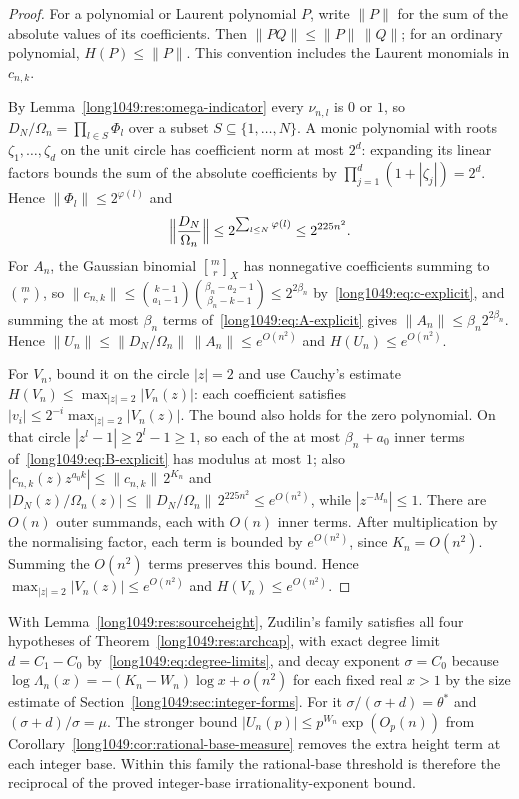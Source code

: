 \documentclass[11pt]{article}
\begin{document}
\begin{proof}
For a polynomial or Laurent polynomial $P$, write $\|P\|$ for the sum
of the absolute values of its coefficients. Then
$\|PQ\|\le\|P\|\,\|Q\|$; for an ordinary polynomial,
$H(P)\le\|P\|$. This convention includes the Laurent monomials in
$c_{n,k}$.

By Lemma~\ref{long1049:res:omega-indicator} every $\nu_{n,l}$ is $0$ or $1$, so
$D_N/\Omega_n=\prod_{l\in S}\Phi_l$ over a subset $S\subseteq\{1,\dots,N\}$.
A monic polynomial with roots $\zeta_1,\ldots,\zeta_d$ on the unit circle
has coefficient norm at most $2^d$: expanding its linear factors bounds
the sum of the absolute coefficients by
$\prod_{j=1}^d(1+|\zeta_j|)=2^d$. Hence $\|\Phi_l\|\le2^{\varphi(l)}$ and
\[
 \Bigl\|\frac{D_N}{\Omega_n}\Bigr\|\le2^{\sum_{l\le N}\varphi(l)}\le2^{225n^{2}} .
\]
For $A_n$, the Gaussian binomial $\genfrac{[}{]}{0pt}{}{m}{r}_X$ has nonnegative
coefficients summing to $\binom{m}{r}$, so
$\|c_{n,k}\|\le\binom{k-1}{a_1-1}\binom{\beta_n-a_2-1}{\beta_n-k-1}\le2^{2\beta_n}$
by~\eqref{long1049:eq:c-explicit}, and summing the at most $\beta_n$ terms
of~\eqref{long1049:eq:A-explicit} gives $\|A_n\|\le\beta_n2^{2\beta_n}$.  Hence
$\|U_n\|\le\|D_N/\Omega_n\|\,\|A_n\|\le e^{O(n^{2})}$ and
$H(U_n)\le e^{O(n^{2})}$.

For $V_n$, bound it on the circle $|z|=2$ and use Cauchy's estimate
$H(V_n)\le\max_{|z|=2}|V_n(z)|$: each coefficient satisfies
$|v_i|\le2^{-i}\max_{|z|=2}|V_n(z)|$. The bound also holds for the
zero polynomial.  On that circle
$|z^{l}-1|\ge2^{l}-1\ge1$, so each of the at most $\beta_n+a_0$ inner terms
of~\eqref{long1049:eq:B-explicit} has modulus at most $1$; also
$|c_{n,k}(z)z^{a_0k}|\le\|c_{n,k}\|\,2^{K_n}$ and
$|D_N(z)/\Omega_n(z)|\le\|D_N/\Omega_n\|\,2^{225n^{2}}\le e^{O(n^{2})}$, while
$|z^{-M_n}|\le1$. There are $O(n)$ outer summands, each with $O(n)$
inner terms. After multiplication by the normalising factor, each
term is bounded by $e^{O(n^2)}$, since $K_n=O(n^2)$. Summing the
$O(n^2)$ terms preserves this bound. Hence
$\max_{|z|=2}|V_n(z)|\le e^{O(n^2)}$ and $H(V_n)\le e^{O(n^2)}$.
\end{proof}

\noindent With Lemma~\ref{long1049:res:sourceheight}, Zudilin's family satisfies all four
hypotheses of Theorem~\ref{long1049:res:archcap}, with exact degree limit $d=C_1-C_0$
by~\eqref{long1049:eq:degree-limits}, and decay exponent $\sigma=C_0$ because
$\log\Lambda_n(x)=-(K_n-W_n)\log x+o(n^{2})$ for each fixed real $x>1$ by the
size estimate of Section~\ref{long1049:sec:integer-forms}.  For it $\sigma/(\sigma+d)=\theta^{*}$ and
$(\sigma+d)/\sigma=\mu$. The stronger bound
$|U_n(p)|\le p^{W_n}\exp(O_p(n))$ from
Corollary~\ref{long1049:cor:rational-base-measure} removes the extra height
term at each integer base. Within this family the rational-base
threshold is therefore the reciprocal of the proved integer-base
irrationality-exponent bound.
\end{document}
